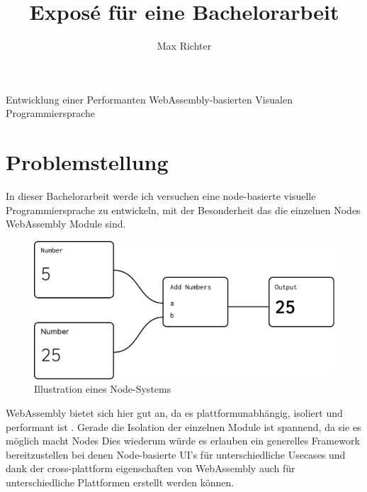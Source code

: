 \documentclass{article}
\title{Exposé für eine Bachelorarbeit}
\author{Max Richter}
\begin{document}
\pagestyle{fancy}
\fancyhead{} %
\fancyfoot{} %
\fancyfoot[LE,RO]{\thepage}

\raggedright

\maketitle
\pagebreak

{\LARGE Entwicklung einer Performanten WebAssembly-basierten Visualen Programmiersprache}
  
\section{Problemstellung}
In dieser Bachelorarbeit werde ich versuchen eine node-basierte visuelle Programmiersprache zu entwickeln, mit der Besonderheit das die einzelnen Nodes WebAssembly Module sind.
\begin{figure}[h]
\includegraphics[width=\textwidth]{ideas/nodes.pdf}
\caption{Illustration eines Node-Systems}
\end{figure}
\linebreak
\linebreak
WebAssembly bietet sich hier gut an, da es plattformunabhängig, isoliert und performant ist \cite{Haas2017}. Gerade die Isolation der einzelnen Module ist spannend, da sie es möglich macht Nodes
\linebreak
\linebreak
Dies wiederum würde es erlauben ein generelles Framework bereitzustellen bei denen Node-basierte UI's für unterschiedliche Usecases und dank der cross-plattform eigenschaften von WebAssembly auch für unterschiedliche Plattformen erstellt werden können.
\end{document}
